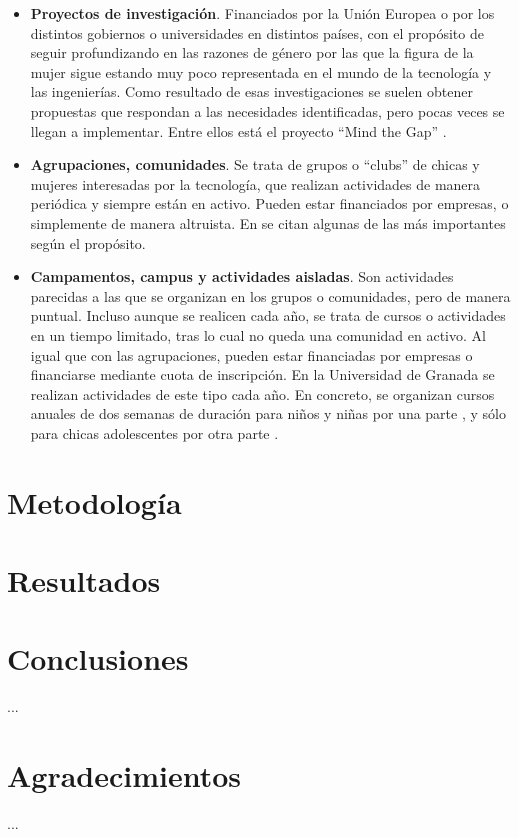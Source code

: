\documentclass[runningheads,a4paper]{llncs}
\begin{document}
\begin{itemize}
  \item \textbf{Proyectos de investigación}. Financiados por la Unión Europea o por los distintos gobiernos o universidades en distintos países, con el propósito de seguir profundizando en las razones de género por las que la figura de la mujer sigue estando muy poco representada en el mundo de la tecnología y las ingenierías. Como resultado de esas investigaciones se suelen obtener propuestas que respondan a las necesidades identificadas, pero pocas veces se llegan a implementar. Entre ellos está el proyecto ``Mind the Gap'' \cite{mtg:site}.
  \item \textbf{Agrupaciones, comunidades}. Se trata de grupos o ``clubs'' de chicas y mujeres interesadas por la tecnología, que realizan actividades de manera periódica y siempre están en activo. Pueden estar financiados por empresas, o simplemente de manera altruista. En \cite{kira2012} se citan algunas de las más importantes según el propósito.
  \item \textbf{Campamentos, campus y actividades aisladas}. Son actividades parecidas a las que se organizan en los grupos o comunidades, pero de manera puntual. Incluso aunque se realicen cada año, se trata de cursos o actividades en un tiempo limitado, tras lo cual no queda una comunidad en activo. Al igual que con las agrupaciones, pueden estar financiadas por empresas o financiarse mediante cuota de inscripción. En la Universidad de Granada se realizan actividades de este tipo cada año. En concreto, se organizan cursos anuales de dos semanas de duración para niños y niñas por una parte \cite{cinfant:site}, y sólo para chicas adolescentes por otra parte \cite{cchicas:site}.
\end{itemize}

\section{Metodología}
\label{sec:metodologia}

\section{Resultados}
\label{sec:resultados}

\section{Conclusiones}
\label{sec:conclusiones}

...


\section*{Agradecimientos} 

...


%




\end{document}
